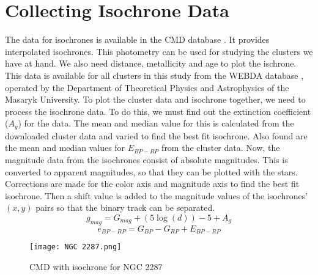 \section{Collecting Isochrone Data}
The data for isochrones is available in the CMD database \citep{cmdSite}. It provides interpolated isochrones. This photometry can be used for studying the clusters we have at hand. We also need distance, metallicity and age to plot the ischrone. This data is available for all clusters in this study from the WEBDA database \citep{webda}, operated by the Department of Theoretical Physics and Astrophysics of the Masaryk University. To plot the cluster data and isochrone together, we need to process the isochrone data. To do this, we must find out the extinction coefficient ($A_g$) for the data. The mean and median value for this is calculated from the downloaded cluster data and varied to find the best fit isochrone. Also found are the mean and median values for $E_{BP-RP}$ from the cluster data. Now, the magnitude data from the isochrones consist of absolute magnitudes. This is converted to apparent magnitudes, so that they can be plotted with the stars. Corrections are made for the color axis and magnitude axis to find the best fit isochrone. Then a shift value is added to the magnitude values of the isochrones' $(x,y)$ pairs so that the binary track can be separated.
$$g_{mag} = G_{mag} + (5 \log(d)) - 5 + A_g$$
$$e_{BP-RP} = G_{BP} - G_{RP} + E_{BP-RP}$$

\begin{figure}[h]
	\centering
	\texttt{[image: NGC 2287.png]}
	\caption{CMD with isochrone for NGC 2287}
	\label{fig:im3}
\end{figure}


